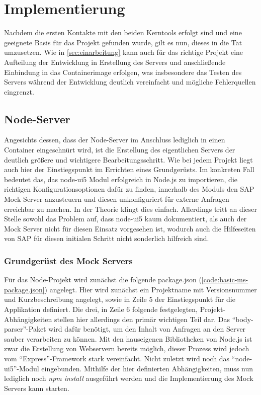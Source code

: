 \chapter{Implementierung}
Nachdem die ersten Kontakte mit den beiden Kerntools erfolgt sind und eine geeignete Basis für das Projekt gefunden wurde, gilt es nun, dieses in die Tat umzusetzen.
Wie in \autoref{sec:einarbeitung} kann auch für das richtige Projekt eine Aufteilung der Entwicklung in Erstellung des Servers und anschließende Einbindung in das Containerimage erfolgen, was insbesondere das Testen des Servers während der Entwicklung deutlich vereinfacht und mögliche Fehlerquellen eingrenzt.

\section{Node-Server}
Angesichts dessen, dass der Node-Server im Anschluss lediglich in einen Container eingeschnürt wird, ist die Erstellung des eigentlichen Servers der deutlich größere und wichtigere Bearbeitungsschritt.
Wie bei jedem Projekt liegt auch hier der Einstiegspunkt im Errichten eines Grundgerüsts.
Im konkreten Fall bedeutet das, das node-ui5 Modul erfolgreich in Node.js zu importieren, die richtigen Konfigurationsoptionen dafür zu finden, innerhalb des Moduls den SAP Mock Server anzusteuern und diesen unkonfiguriert für externe Anfragen erreichbar zu machen.
In der Theorie klingt dies einfach.
Allerdings tritt an dieser Stelle sowohl das Problem auf, dass node-ui5 kaum dokumentiert, als auch der Mock Server nicht für diesen Einsatz vorgesehen ist, wodurch auch die Hilfeseiten von SAP für diesen initialen Schritt nicht sonderlich hilfreich sind.

\subsection{Grundgerüst des Mock Servers}
\label{subsec:foundation}
Für das Node-Projekt wird zunächst die folgende package.json (\autoref{code:basic-ms-package.json}) angelegt.
Hier wird zunächst ein Projektname mit Versionsnummer und Kurzbeschreibung angelegt, sowie in Zeile 5 der Einstiegspunkt für die Applikation definiert.
Die drei, in Zeile 6 folgende festgelegten, Projekt-Abhängigkeiten stellen hier allerdings den primär wichtigen Teil dar.
Das \enquote{body-parser}-Paket wird dafür benötigt, um den Inhalt von Anfragen an den Server sauber verarbeiten zu können.
Mit den hauseigenen Bibliotheken von Node.js ist zwar die Erstellung von Webservern bereits möglich, dieser Prozess wird jedoch vom \enquote{Express}-Framework stark vereinfacht.
Nicht zuletzt wird noch das \enquote{node-ui5}-Modul eingebunden.
Mithilfe der hier definierten Abhängigkeiten, muss nun lediglich noch \emph{npm install} ausgeführt werden und die Implementierung des Mock Servers kann starten.


